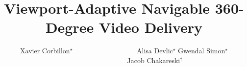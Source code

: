 \documentclass[t,12pt,pdftex, aspectratio=1610]{beamer}
\title[Viewport-Adaptive Navigable 360-Degree Video Delivery]{\Large
Viewport-Adaptive Navigable 360-Degree Video Delivery\newline}
\author[\ifthenelse{\boolean{isGwendal}}{Gwendal Simon}{Xavier Corbillon} et al.]{\hspace{-2.5pt}Xavier
Corbillon$^{\star}$ \hfill ~~~~~~~~~~~~~~~~~~Alisa Devlic$^{\star}$
\newline Gwendal Simon$^{\star}$ \hfill ~~~~~~~~~~~~~~~~~~Jacob Chakareski$^{\dagger}$}
\date{}
\begin{document}
	
	


\inserttitlepage


\newcommand\insertTableOfContents{

\begin{frame}[c,noframenumbering]
	\frametitle{Table of contents}
	\tableofcontents[hideallsubsections]
\end{frame}
}

\newcommand\defineContentTable{
    \AtBeginSection[] {
     \begin{frame}[c,noframenumbering]
     \frametitle{Table of contents}
       \small \tableofcontents[hideallsubsections,sectionstyle=show/shaded,subsectionstyle=hide/hide/hide ]
     \end{frame}
    }
}






%
%
%
\end{document}
